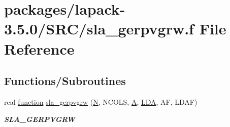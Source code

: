 \hypertarget{sla__gerpvgrw_8f}{}\section{packages/lapack-\/3.5.0/\+S\+R\+C/sla\+\_\+gerpvgrw.f File Reference}
\label{sla__gerpvgrw_8f}
\subsection*{Functions/\+Subroutines}
\begin{DoxyCompactItemize}
\item 
real \hyperlink{afunc_8m_a7b5e596df91eadea6c537c0825e894a7}{function} \hyperlink{group__realGEcomputational_gabe2075a63cd1cd91a5fa0b521868f0d4}{sla\+\_\+gerpvgrw} (\hyperlink{polmisc_8c_a0240ac851181b84ac374872dc5434ee4}{N}, N\+C\+O\+L\+S, \hyperlink{classA}{A}, \hyperlink{example__user_8c_ae946da542ce0db94dced19b2ecefd1aa}{L\+D\+A}, A\+F, L\+D\+A\+F)
\begin{DoxyCompactList}\small\item\em {\bfseries S\+L\+A\+\_\+\+G\+E\+R\+P\+V\+G\+R\+W} \end{DoxyCompactList}\end{DoxyCompactItemize}
